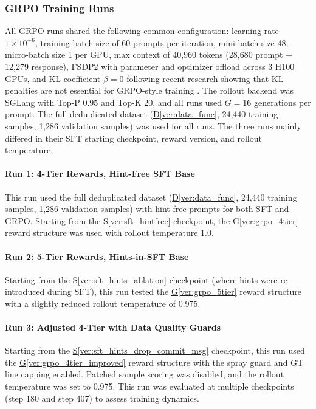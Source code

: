 \documentclass[12pt,a4paper]{article}
\begin{document}

\subsubsection{GRPO Training Runs}

All GRPO runs shared the following common configuration: learning rate $1 \times 10^{-6}$, training batch size of 60 prompts per iteration, mini-batch size 48, micro-batch size 1 per GPU, max context of 40,960 tokens (28,680 prompt + 12,279 response), FSDP2 with parameter and optimizer offload across 3 H100 GPUs, and KL coefficient $\beta = 0$ following recent research showing that KL penalties are not essential for GRPO-style training \cite{dapo, drgrpo}. The rollout backend was SGLang \cite{sglang} with Top-P 0.95 and Top-K 20, and all runs used $G=16$ generations per prompt. The full deduplicated dataset (\hyperref[ver:data_func]{D\ref*{ver:data_func}}, 24,440 training samples, 1,286 validation samples) was used for all runs. The three runs mainly differed in their SFT starting checkpoint, reward version, and rollout temperature.

\paragraph{Run 1: 4-Tier Rewards, Hint-Free SFT Base}
This run used the full deduplicated dataset (\hyperref[ver:data_func]{D\ref*{ver:data_func}}, 24,440 training samples, 1,286 validation samples) with hint-free prompts for both SFT and GRPO. Starting from the \hyperref[ver:sft_hintfree]{S\ref*{ver:sft_hintfree}} checkpoint, the \hyperref[ver:grpo_4tier]{G\ref*{ver:grpo_4tier}} reward structure was used with rollout temperature 1.0.

\paragraph{Run 2: 5-Tier Rewards, Hints-in-SFT Base}
Starting from the \hyperref[ver:sft_hints_ablation]{S\ref*{ver:sft_hints_ablation}} checkpoint (where hints were re-introduced during SFT), this run tested the \hyperref[ver:grpo_5tier]{G\ref*{ver:grpo_5tier}} reward structure with a slightly reduced rollout temperature of 0.975.

\paragraph{Run 3: Adjusted 4-Tier with Data Quality Guards}
Starting from the \hyperref[ver:sft_hints_drop_commit_msg]{S\ref*{ver:sft_hints_drop_commit_msg}} checkpoint, this run used the \hyperref[ver:grpo_4tier_improved]{G\ref*{ver:grpo_4tier_improved}} reward structure with the spray guard and GT line capping enabled. Patched sample scoring was disabled, and the rollout temperature was set to 0.975. This run was evaluated at multiple checkpoints (step 180 and step 407) to assess training dynamics.
\end{document}
